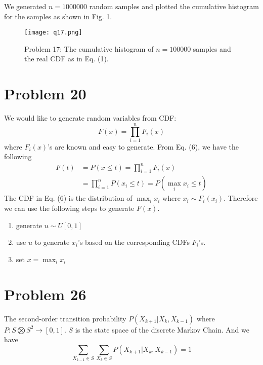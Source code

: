 \documentclass[a4paper, 11pt]{article}
\begin{document}
We generated $n = 1000000$ random samples and plotted the cumulative histogram for the samples as shown in Fig. 1. 

\begin{figure}
	\begin{center}
		\texttt{[image: q17.png]}
		\caption{Problem 17: The cumulative histogram of $n=100000$ samples and the real CDF as in Eq. (1).}
	\end{center}
\end{figure}





\section*{Problem 20}

We would like to generate random variables from CDF: 
\begin{equation}
	F(x) = \prod_{i=1}^n F_i(x)
\end{equation}
where $F_i(x)$'s are known and easy to generate. From Eq. (6), we have the following
\begin{equation}
\begin{split}
F(t) & = P(x \leq t) = \prod_{i=1}^n F_i(x) \\
 & = \prod_{i=1}^n P(x_i \leq t) = P(\max_i x_i \leq t)
\end{split}
\end{equation}
The CDF in Eq. (6) is the distribution of $\max_i x_i$ where $x_i \sim F_i(x_i)$. Therefore we can use the following steps to generate $F(x)$. 

\begin{enumerate}
	\item generate $u \sim U[0, 1]$
	\item use $u$ to generate $x_i$'s based on the corresponding CDFs $F_i$'s. 
	\item set $x = \max_i x_i$ 
\end{enumerate}



\section*{Problem 26}

The second-order transition probability $P(X_{k+1}|X_k, X_{k-1})$ where $P: {S \bigotimes  S^2} \to [0, 1]$. $S$ is the state space of the discrete Markov Chain. And we have 
\begin{equation}
\sum_{X_{k-1}\in S}\sum_{X_k\in S} P(X_{k+1}|X_k, X_{k-1}) = 1
\end{equation}
\end{document}
